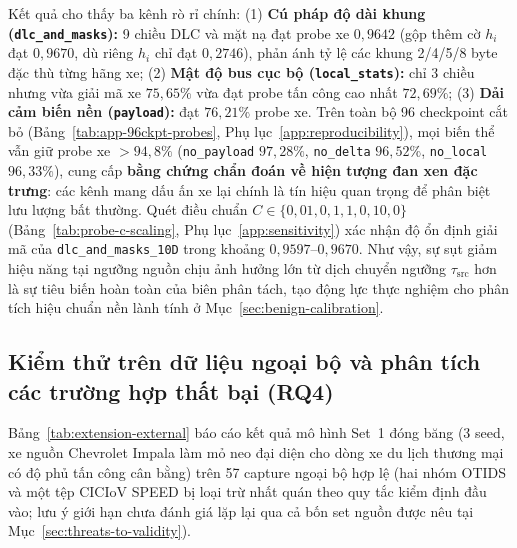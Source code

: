 \documentclass[12pt, a4paper, reqno, oneside]{book}
\DeclareRobustCommand{\code}[1]{\nolinkurl{#1}}
\begin{document}
Kết quả cho thấy ba kênh rò rỉ chính: (1) \textbf{Cú pháp độ dài khung (\code{dlc\_and\_masks}):} 9 chiều DLC và mặt nạ đạt probe xe $0{,}9642$ (gộp thêm cờ $h_i$ đạt $0{,}9670$, dù riêng $h_i$ chỉ đạt $0{,}2746$), phản ánh tỷ lệ các khung 2/4/5/8 byte đặc thù từng hãng xe; (2) \textbf{Mật độ bus cục bộ (\code{local\_stats}):} chỉ 3 chiều nhưng vừa giải mã xe $75{,}65\%$ vừa đạt probe tấn công cao nhất $72{,}69\%$; (3) \textbf{Dải cảm biến nền (\code{payload}):} đạt $76{,}21\%$ probe xe. Trên toàn bộ 96 checkpoint cắt bỏ (Bảng~\ref{tab:app-96ckpt-probes}, Phụ lục~\ref{app:reproducibility}), mọi biến thể vẫn giữ probe xe $>94{,}8\%$ (\code{no\_payload} $97{,}28\%$, \code{no\_delta} $96{,}52\%$, \code{no\_local} $96{,}33\%$), cung cấp \textbf{bằng chứng chẩn đoán về hiện tượng đan xen đặc trưng}: các kênh mang dấu ấn xe lại chính là tín hiệu quan trọng để phân biệt lưu lượng bất thường. Quét điều chuẩn $C \in \{0{,}01, 0{,}1, 1{,}0, 10{,}0\}$ (Bảng~\ref{tab:probe-c-scaling}, Phụ lục~\ref{app:sensitivity}) xác nhận độ ổn định giải mã của \code{dlc\_and\_masks\_10D} trong khoảng $0{,}9597\text{--}0{,}9670$. Như vậy, sự sụt giảm hiệu năng tại ngưỡng nguồn chịu ảnh hưởng lớn từ dịch chuyển ngưỡng $\tau_{\text{src}}$ hơn là sự tiêu biến hoàn toàn của biên phân tách, tạo động lực thực nghiệm cho phân tích hiệu chuẩn nền lành tính ở Mục~\ref{sec:benign-calibration}.

\subsection{Kiểm thử trên dữ liệu ngoại bộ và phân tích các trường hợp thất bại (RQ4)}
Bảng~\ref{tab:extension-external} báo cáo kết quả mô hình Set~1 đóng băng (3 seed, xe nguồn Chevrolet Impala làm mỏ neo đại diện cho dòng xe du lịch thương mại có độ phủ tấn công cân bằng) trên 57 capture ngoại bộ hợp lệ (hai nhóm OTIDS và một tệp CICIoV SPEED bị loại trừ nhất quán theo quy tắc kiểm định đầu vào; lưu ý giới hạn chưa đánh giá lặp lại qua cả bốn set nguồn được nêu tại Mục~\ref{sec:threats-to-validity}).
\end{document}
